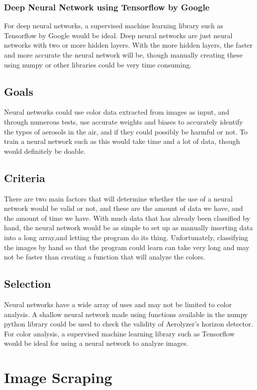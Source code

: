 \documentclass[onecolumn, draftclsnofoot,10pt, compsoc]{IEEEtran}
\begin{document}
\begin{singlespace}
\subsubsection{Deep Neural Network using Tensorflow by Google}
For deep neural networks, a supervised machine learning library such as Tensorflow by Google would be ideal. Deep neural networks are just neural networks with two or more hidden layers. With the more hidden layers, the faster and more accurate the neural network will be, though manually creating these using numpy or other libraries could be very time consuming.

\subsection{Goals}
Neural networks could use color data extracted from images as input, and through numerous tests, use accurate weights and biases to accurately identify the types of aerosols in the air, and if they could possibly be harmful or not. To train a neural network such as this would take time and a lot of data, though would definitely be doable. 


\subsection{Criteria}
There are two main factors that will determine whether the use of a neural network would be valid or not, and these are the amount of data we have, and the amount of time we have. With much data that has already been classified by hand, the neural network would be as simple to set up as manually inserting data into a long array,and letting the program do its thing. Unfortunately, classifying the images by hand so that the program could learn can take very long and may not be faster than creating a function that will analyze the colors. 

\subsection{Selection}
Neural networks have a wide array of uses and may not be limited to color analysis. A shallow neural network made using functions available in the numpy python library could be used to check the validity of Aerolyzer's horizon detector. For color analysis, a supervised machine learning library such as Tensorflow would be ideal for using a neural network to analyze images. 


\section{Image Scraping}

\end{singlespace}
\end{document}
